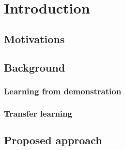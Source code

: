 \documentclass[a4paper]{report}
\begin{document}
	
	
	\tableofcontents
	
	\chapter{Introduction}
	{
		\section{Motivations}
		{
			
		}
		\section{Background}
		{
			\subsection{Learning from demonstration}
			{
			
			}
			\subsection{Transfer learning}
			{
			
			}
		}
		\section{Proposed approach}
		{

		}
	}
	\newpage
	
\end{document}
